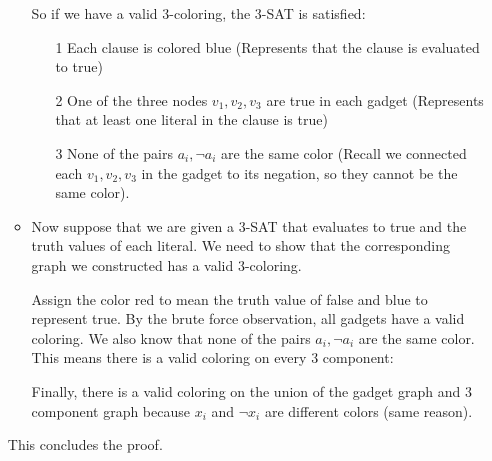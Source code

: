 \documentclass{article}
\begin{document}
\begin{itemize}
\begin{answer}
\begin{itemize}
                            So if we have a valid $3$-coloring, the $3$-SAT is satisfied:
                                \begin{itemize}
                                    \item [1] Each clause is colored blue (Represents that the clause is evaluated to true)

                                    \item [2] One of the three nodes $v_{1}, v_{2}, v_{3}$ are true in each gadget (Represents that at least one literal in the clause is true)

                                    \item [3] None of the pairs $a_{i}, \lnot a_{i}$ are the same color (Recall we connected each $v_{1}, v_{2}, v_{3}$ in the gadget to its negation, so they cannot be the same color).
                                \end{itemize}

                            \item Now suppose that we are given a $3$-SAT that evaluates to true and the truth values of each literal. We need to show that the corresponding graph we constructed has a valid $3$-coloring.

                            Assign the color red to mean the truth value of false and blue to represent true. By the brute force observation, all gadgets have a valid coloring. We also know that none of the pairs $a_{i}, \lnot a_{i}$ are the same color. This means there is a valid coloring on every $3$ component:
                            \begin{center}
                                \begin{fixedfigure}
                                \end{fixedfigure}
                            \end{center}
                            Finally, there is a valid coloring on the union of the gadget graph and $3$ component graph because $x_{i}$ and $\lnot x_{i}$ are different colors (same reason).
                        \end{itemize}
                    This concludes the proof.
                \end{answer}
    \end{itemize}
\end{document}
